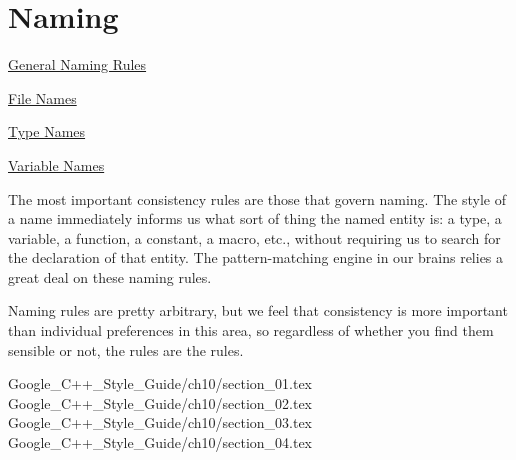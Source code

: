 
\chapter{Naming}\label{ch:naming}

\begin{introduction}
    \item \hyperref[sec:general-naming-rules]{General Naming Rules}
    \item \hyperref[sec:file-names]{File Names}
    \item \hyperref[sec:type-names]{Type Names}
    \item \hyperref[sec:variable-names]{Variable Names}
\end{introduction}

The most important consistency rules are those that govern naming. The style of a name immediately informs us what sort of thing the named entity is: a type, a variable, a function, a constant, a macro, etc., without requiring us to search for the declaration of that entity. The pattern-matching engine in our brains relies a great deal on these naming rules.

Naming rules are pretty arbitrary, but we feel that consistency is more important than individual preferences in this area, so regardless of whether you find them sensible or not, the rules are the rules.

{Google_C++_Style_Guide/ch10/section_01.tex}
{Google_C++_Style_Guide/ch10/section_02.tex}
{Google_C++_Style_Guide/ch10/section_03.tex}
{Google_C++_Style_Guide/ch10/section_04.tex}
